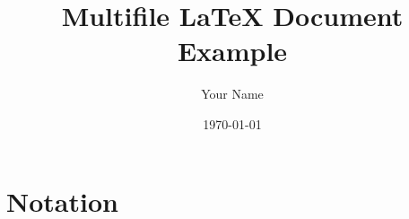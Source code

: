 \documentclass{report}
\title{Multifile LaTeX Document Example}
\author{Your Name}
\date{\today}
\begin{document}
\maketitle

\tableofcontents




\setcounter{section}{1}


% 
\section{Notation}





\printindex
\end{document}
